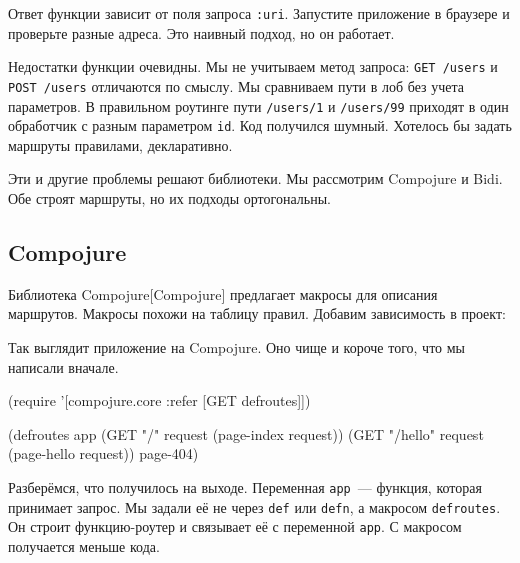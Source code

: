 Ответ функции зависит от поля запроса \verb|:uri|. Запустите приложение в
браузере и проверьте разные адреса. Это наивный подход, но он работает.

Недостатки функции очевидны. Мы не учитываем метод запроса: \verb|GET /users|
и \verb|POST /users| отличаются по смыслу. Мы сравниваем пути в лоб без учета
параметров. В правильном роутинге пути \verb|/users/1| и \verb|/users/99|
приходят в один обработчик с разным параметром \verb|id|. Код получился
шумный. Хотелось бы задать маршруты правилами, декларативно.

Эти и другие проблемы решают библиотеки. Мы рассмотрим Compojure и Bidi. Обе
строят маршруты, но их подходы ортогональны.

\subsection{Compojure}

\label{compojure}


Библиотека Compojure[Compojure]
предлагает макросы для описания маршрутов. Макросы похожи на таблицу правил.
Добавим зависимость в проект:

\begin{english}
  \begin{clojure}
[compojure "1.6.1"]
  \end{clojure}
\end{english}

Так выглядит приложение на Compojure. Оно чище и короче того, что мы написали
вначале.


\begin{english}
  \begin{clojure}
(require '[compojure.core :refer [GET defroutes]])

(defroutes app
  (GET "/"      request (page-index request))
  (GET "/hello" request (page-hello request))
  page-404)
  \end{clojure}
\end{english}

Разберёмся, что получилось на выходе. Переменная \verb|app|~--- функция,
которая принимает запрос. Мы задали её не через \verb|def| или \verb|defn|,
а макросом \verb|defroutes|. Он строит функцию-роутер и связывает её с
переменной \verb|app|. С макросом получается меньше кода.

